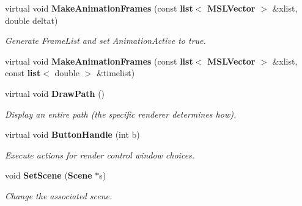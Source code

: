 \begin{CompactItemize}
virtual void {\bf Make\-Animation\-Frames} (const {\bf list}$<$ {\bf MSLVector} $>$ \&xlist, double deltat)
\begin{CompactList}\small\item\em Generate Frame\-List and set Animation\-Active to true.\item\end{CompactList}\item 
virtual void {\bf Make\-Animation\-Frames} (const {\bf list}$<$ {\bf MSLVector} $>$ \&xlist, const {\bf list}$<$ double $>$ \&timelist)
\item 
virtual void {\bf Draw\-Path} ()
\begin{CompactList}\small\item\em Display an entire path (the specific renderer determines how).\item\end{CompactList}\item 
virtual void {\bf Button\-Handle} (int b)
\begin{CompactList}\small\item\em Execute actions for render control window choices.\item\end{CompactList}\item 
void {\bf Set\-Scene} ({\bf Scene} $\ast$s)
\begin{CompactList}\small\item\em Change the associated scene.\item\end{CompactList}\end{CompactItemize}
